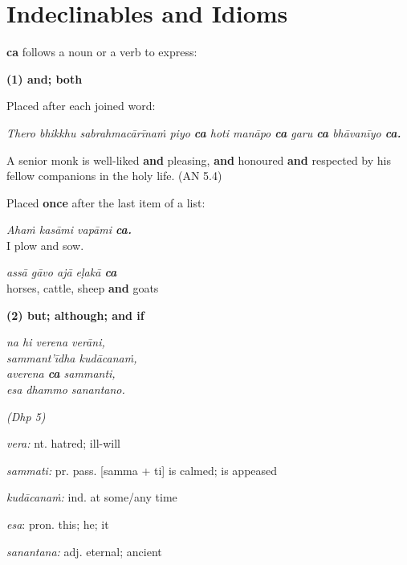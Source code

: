 \documentclass[11pt,oneside]{memoir}
\begin{document}
\section{Indeclinables and Idioms}
\label{sec:org40b8381}

\textbf{ca} follows a noun or a verb to express:

\begin{multicols}{2}

\textbf{(1) and; both}

Placed after each joined word:

\emph{Thero bhikkhu sabrahmacārīnaṁ piyo \textbf{ca} hoti manāpo \textbf{ca} garu \textbf{ca} bhāvanīyo \textbf{ca.}}

A senior monk is well-liked \textbf{and} pleasing, \textbf{and} honoured \textbf{and} respected by his fellow companions in the holy life. (AN 5.4)

Placed \textbf{once} after the last item of a list:

\emph{Ahaṁ kasāmi vapāmi \textbf{ca.}} \\
I plow and sow.

\emph{assā gāvo ajā eḷakā \textbf{ca}} \\
horses, cattle, sheep \textbf{and} goats

\columnbreak

\textbf{(2) but; although; and if}

\emph{na hi verena verāni,} \\
\emph{sammant'īdha kudācanaṁ,} \\
\emph{averena \textbf{ca} sammanti,} \\
\emph{esa dhammo sanantano.}

\emph{(Dhp 5)}

\emph{vera:} nt. hatred; ill-will

\emph{sammati:} pr. pass. [samma + ti] is calmed; is appeased

\emph{kudācanaṁ:} ind. at some/any time

\emph{esa}: pron. this; he; it

\emph{sanantana:} adj. eternal; ancient

\end{multicols}

\clearpage
\end{document}
